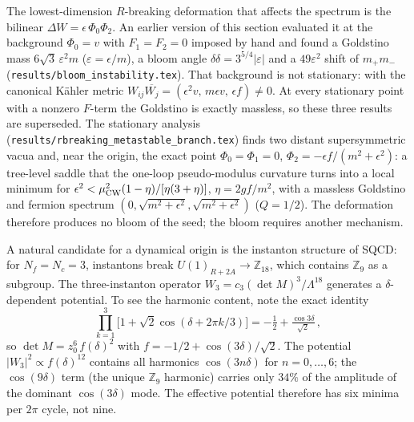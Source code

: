 \documentclass[12pt,a4paper]{article}
\begin{document}
\begin{sloppypar}
The lowest-dimension $R$-breaking deformation that affects the
spectrum is the bilinear $\Delta W = \epsilon\,\Phi_0\Phi_2$.
An earlier version of this section evaluated it at the background
$\Phi_0 = v$ with $F_1 = F_2 = 0$ imposed by hand and found a Goldstino
mass $6\sqrt3\,\varepsilon^2 m$ ($\varepsilon = \epsilon/m$), a bloom angle
$\delta\delta = 3^{5/4}|\varepsilon|$ and a $49\varepsilon^2$ shift of
$m_+m_-$ (\texttt{results/bloom\_instability.tex}). That background is not
stationary: with the canonical K\"ahler metric
$W_{ij}\overline{W_j} = (\epsilon^2 v,\, m\epsilon v,\, \epsilon f) \neq 0$.
At every stationary point with a nonzero $F$-term the Goldstino is exactly
massless, so these three results are superseded. The stationary analysis
(\texttt{results/rbreaking\_metastable\_branch.tex}) finds two distant
supersymmetric vacua and, near the origin, the exact point
$\Phi_0 = \Phi_1 = 0$, $\Phi_2 = -\epsilon f/(m^2 + \epsilon^2)$: a tree-level
saddle that the one-loop pseudo-modulus curvature turns into a local
minimum for $\epsilon^2 < \mu^2_{\rm CW}(1-\eta)/[\eta(3+\eta)]$,
$\eta = 2gf/m^2$, with a massless Goldstino and fermion spectrum
$(0, \sqrt{m^2+\epsilon^2}, \sqrt{m^2+\epsilon^2})$ ($Q = 1/2$). The
deformation therefore produces no bloom of the seed; the bloom requires
another mechanism.
\end{sloppypar}

A natural candidate for a dynamical origin is the instanton structure of
SQCD: for $N_f = N_c = 3$, instantons break $U(1)_{R+2A} \to \mathbb{Z}_{18}$,
which contains $\mathbb{Z}_9$ as a subgroup. The three-instanton operator
$W_3 = c_3(\det M)^3/\Lambda^{18}$ generates a $\delta$-dependent
potential. To see the harmonic content, note the exact identity
\begin{equation}
  \prod_{k=1}^{3}\bigl[1 + \sqrt{2}\cos(\delta + 2\pi k/3)\bigr]
  = -\tfrac{1}{2} + \tfrac{\cos 3\delta}{\sqrt{2}}\,,
\end{equation}
so $\det M = z_0^6\,f(\delta)^2$ with
$f = -1/2 + \cos(3\delta)/\sqrt{2}$.
The potential $|W_3|^2 \propto f(\delta)^{12}$ contains all harmonics
$\cos(3n\delta)$ for $n = 0,\ldots,6$; the $\cos(9\delta)$ term
(the unique $\mathbb{Z}_9$ harmonic) carries only $34\%$ of the
amplitude of the dominant $\cos(3\delta)$ mode.
The effective potential therefore has six minima per $2\pi$ cycle,
not nine.
\end{document}
